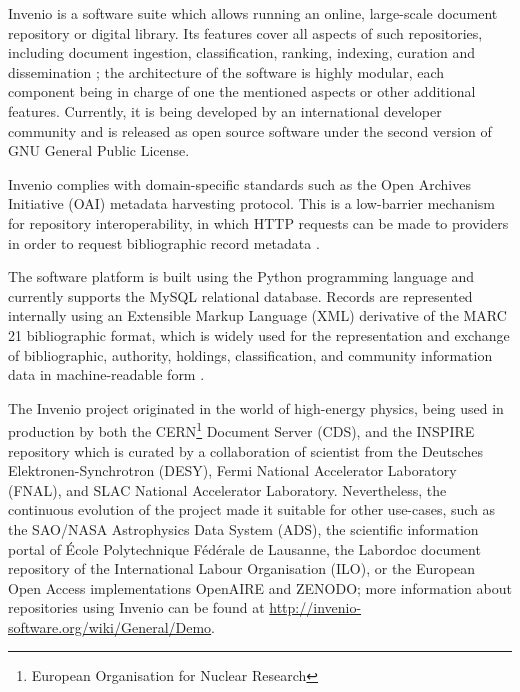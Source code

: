 
Invenio \cite{ref:invenio} is a software suite which allows running an online,
large-scale document repository or digital library. Its features cover all
aspects of such repositories, including document ingestion, classification,
ranking, indexing, curation and dissemination \cite{ref:kaplun, ref:glauner};
the architecture of the software is highly modular, each component being in
charge of one the mentioned aspects or other additional features. Currently, it
is being developed by an international developer community and is released as
open source software under the second version of GNU General Public License.

Invenio complies with domain-specific standards such as the Open Archives
Initiative (OAI) metadata harvesting protocol. This is a low-barrier mechanism for
repository interoperability, in which HTTP requests can be made to providers in
order to request bibliographic record metadata \cite{ref:oai}.

The software platform is built using the Python programming language and
currently supports the MySQL relational database. Records are represented
internally using an Extensible Markup Language (XML) derivative of the MARC 21
bibliographic format, which is widely used for the representation and exchange
of bibliographic, authority, holdings, classification, and community
information data in machine-readable form \cite{ref:marc}.

The Invenio project originated in the world of high-energy physics, being used
in production by both the CERN\footnote{European Organisation for Nuclear
Research} Document Server (CDS), and the INSPIRE repository which is curated
by a collaboration of scientist from the Deutsches Elektronen-Synchrotron
(DESY), Fermi National Accelerator Laboratory (FNAL), and SLAC National
Accelerator Laboratory. Nevertheless, the continuous evolution of the project
made it suitable for other use-cases, such as the SAO/NASA Astrophysics Data
System (ADS), the scientific information portal of \'{E}cole Polytechnique
F\'{e}d\'{e}rale de Lausanne, the Labordoc document repository of the
International Labour Organisation (ILO), or the European Open Access
implementations OpenAIRE and ZENODO; more information about repositories using
Invenio can be found at \url{http://invenio-software.org/wiki/General/Demo}.
